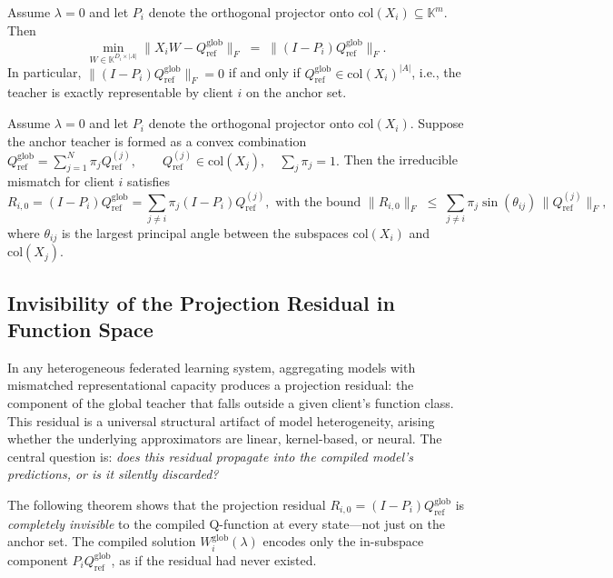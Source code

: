 \begin{proposition}
\label{prop:irreducible}
Assume $\lambda=0$ and let $P_i$ denote the orthogonal projector onto
$\mathrm{col}(X_i)\subseteq\mathbb{K}^m$. Then
\[
\min_{W\in\mathbb{K}^{D_i\times|A|}}\|X_iW-Q^{\mathrm{glob}}_{\mathrm{ref}}\|_F
\;=\;\|(I-P_i)Q^{\mathrm{glob}}_{\mathrm{ref}}\|_F.
\]
In particular, $\|(I-P_i)Q^{\mathrm{glob}}_{\mathrm{ref}}\|_F=0$ if and only if
$Q^{\mathrm{glob}}_{\mathrm{ref}}\in\mathrm{col}(X_i)^{|A|}$, i.e., the teacher is
exactly representable by client $i$ on the anchor set.
\end{proposition}


\begin{proposition}
\label{prop:heterogeneity}
Assume $\lambda=0$ and let $P_i$ denote the orthogonal projector onto
$\mathrm{col}(X_i)$. Suppose the anchor teacher is formed as a convex
combination
\(
Q^{\mathrm{glob}}_{\mathrm{ref}}
=
\sum_{j=1}^N \pi_j Q^{(j)}_{\mathrm{ref}},
\qquad
Q^{(j)}_{\mathrm{ref}}\in\mathrm{col}(X_j),
\quad
\sum_j\pi_j=1.
\)
Then the irreducible mismatch for client $i$ satisfies
\[
R_{i,0}= (I-P_i)Q^{\mathrm{glob}}_{\mathrm{ref}} = \sum_{j\neq i}\pi_j (I-P_i)Q^{(j)}_{\mathrm{ref}}, \text{ with the bound } \|R_{i,0}\|_F \;\le\; \sum_{j\neq i}\pi_j \sin(\theta_{ij}) \,\|Q^{(j)}_{\mathrm{ref}}\|_F,
\]
where $\theta_{ij}$ is the largest principal angle between the subspaces
$\mathrm{col}(X_i)$ and $\mathrm{col}(X_j)$.
\end{proposition}




\subsection{Invisibility of the Projection Residual in Function Space}
\label{subsec:residual_invisibility}

In any heterogeneous federated learning system, aggregating models with
mismatched representational capacity produces a projection residual: the
component of the global teacher that falls outside a given client's
function class. This residual is a universal structural artifact of model
heterogeneity, arising whether the underlying approximators are linear,
kernel-based, or neural. The central question is: \emph{does this
residual propagate into the compiled model's predictions, or is it
silently discarded?}

The following theorem
shows that the projection residual
$R_{i,0} = (I - P_i)Q^{\mathrm{glob}}_{\mathrm{ref}}$ is
\emph{completely invisible} to the compiled Q-function at every
state---not just on the anchor set. The compiled solution
$W^{\mathrm{glob}}_i(\lambda)$ encodes only the in-subspace component
$P_i Q^{\mathrm{glob}}_{\mathrm{ref}}$, as if the residual had never
existed.

